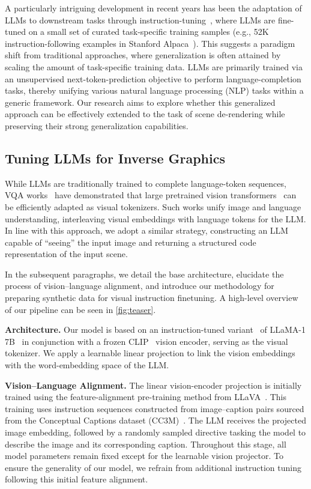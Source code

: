 A particularly intriguing development in recent years has been the adaptation of LLMs to downstream tasks through instruction-tuning~\citep{wei_2024_instruction,Wang2022SelfInstructAL,vicuna2023}, where LLMs are fine-tuned on a small set of curated task-specific training samples (e.g., 52K instruction-following examples in Stanford Alpaca~\citep{alpaca}).
This suggests a paradigm shift from traditional approaches, where generalization is often attained by scaling the amount of task-specific training data.
LLMs are primarily trained via an unsupervised next-token-prediction objective to perform language-completion tasks, 
thereby unifying various natural language processing (NLP) tasks within a generic framework.
Our research aims to explore whether this generalized approach can be effectively extended to the task of scene de-rendering while preserving their strong generalization capabilities.

\subsection{Tuning LLMs for Inverse Graphics}\label{ssec:ig-llm}
While LLMs are traditionally trained to complete language-token sequences, VQA works~\citep{Alayrac2022FlamingoAV, Li2022BLIPBL, liu2023llava} have demonstrated that large pretrained vision transformers~\citep{ Dosovitskiy2020AnII, radford2021learning} can be efficiently adapted as visual tokenizers.
Such works unify image and language understanding, interleaving visual embeddings with language tokens for the LLM.
In line with this approach, we adopt a similar strategy, constructing an LLM capable of ``seeing'' the input image and returning a structured code representation of the input scene.

In the subsequent paragraphs, we detail the base architecture, elucidate the process of vision--language alignment, and introduce our methodology for preparing synthetic data for visual instruction finetuning.
A high-level overview of our pipeline can be seen in \cref{fig:teaser}.

\noindent\textbf{Architecture.}
Our model is based on an instruction-tuned variant~\citep{peng2023instruction} of LLaMA-1 7B~\citep{touvron2023llama} in conjunction with a frozen CLIP~\citep{radford2021learning} vision encoder, serving as the visual tokenizer.
We apply a learnable linear projection to link the vision embeddings with the word-embedding space of the LLM.

\noindent\textbf{Vision--Language Alignment.}
The linear vision-encoder projection is initially trained using the feature-alignment pre-training method from LLaVA~\citep{liu2023llava}.
This training uses instruction sequences constructed from image--caption pairs sourced from the Conceptual Captions dataset (CC3M)~\hbox{\citep{sharma2018conceptual}}.
The LLM receives the projected image embedding, followed by a randomly sampled directive tasking the model to describe the image and its corresponding caption.
Throughout this stage, all model parameters remain fixed except for the learnable vision projector.
To ensure the generality of our model, we refrain from additional instruction tuning following this initial feature alignment.


